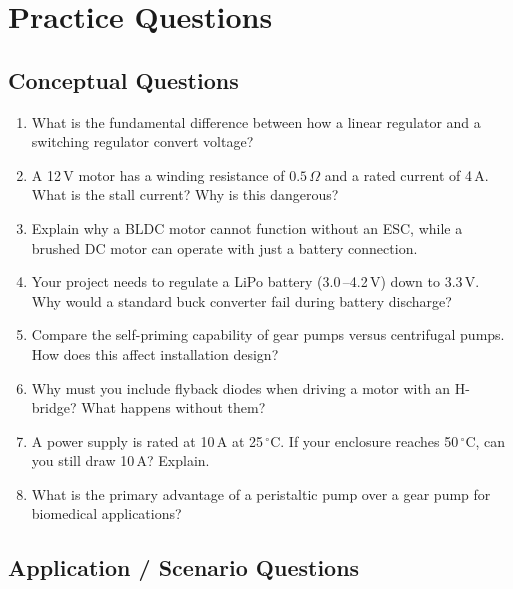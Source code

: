 \documentclass[11pt,letterpaper,twoside,openany]{book}
\begin{document}
\FloatBarrier
\section{Practice Questions}

\subsection{Conceptual Questions}

\begin{enumerate}[leftmargin=1.5em]
  \item What is the fundamental difference between how a linear regulator and a switching regulator convert voltage?

  \item A 12\,V motor has a winding resistance of 0.$5\,\Omega$ and a rated current of 4\,A. What is the stall current? Why is this dangerous?

  \item Explain why a BLDC motor cannot function without an ESC, while a brushed DC motor can operate with just a battery connection.

  \item Your project needs to regulate a LiPo battery (3.0\,--4.2\,V) down to 3.3\,V. Why would a standard buck converter fail during battery discharge?

  \item Compare the self-priming capability of gear pumps versus centrifugal pumps. How does this affect installation design?

  \item Why must you include flyback diodes when driving a motor with an H-bridge? What happens without them?

  \item A power supply is rated at 10\,A at 25\,$^{\circ}$C. If your enclosure reaches 50\,$^{\circ}$C, can you still draw 10\,A? Explain.

  \item What is the primary advantage of a peristaltic pump over a gear pump for biomedical applications?
\end{enumerate}

\subsection{Application / Scenario Questions}
\end{document}
